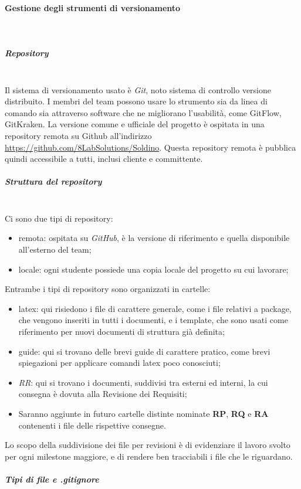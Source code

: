 			\paragraph{Gestione degli strumenti di versionamento} \mbox{}\\
			\subparagraph{Repository} \mbox{}\\
			Il sistema di versionamento usato è \textit{Git}, noto sistema di controllo versione distribuito. I membri del team possono usare lo strumento sia da linea di comando sia attraverso software che ne migliorano l'usabilità, come GitFlow, GitKraken. La versione comune e ufficiale del progetto è  ospitata in una repository remota su Github all'indirizzo  
			\url{https://github.com/8LabSolutions/Soldino}. Questa repository remota è pubblica quindi accessibile a tutti, inclusi cliente e committente.
			\subparagraph{Struttura del repository} \mbox{}\\
			Ci sono due tipi di repository:
			\begin{itemize}
				\item remota: ospitata su \textit{GitHub}, è la versione di riferimento e quella disponibile all'esterno del team;
				\item locale: ogni studente possiede una copia locale del progetto su cui lavorare;
			\end{itemize}						
			Entrambe i tipi di repository sono organizzati in cartelle:
			\begin{itemize}
				\item latex: qui risiedono i file di carattere generale, come i file relativi a package, che vengono inseriti in tutti i documenti, e i template, che sono usati come riferimento per nuovi documenti di struttura già definita;
				\item guide: qui si trovano delle brevi guide di carattere pratico, come brevi spiegazioni per applicare comandi latex poco conosciuti;
				\item \textit{RR}: qui si trovano i documenti, suddivisi tra esterni ed interni, la cui consegna è dovuta alla Revisione dei Requisiti;
				\item Saranno aggiunte in futuro cartelle distinte nominate \textbf{RP}, \textbf{RQ} e \textbf{RA} contenenti i file delle rispettive consegne.
			\end{itemize}
			Lo scopo della suddivisione dei file per revisioni è di evidenziare il lavoro svolto per ogni milestone maggiore, e di rendere ben tracciabili i file che le riguardano.
			\subparagraph{Tipi di file e .gitignore} \mbox{}\\

